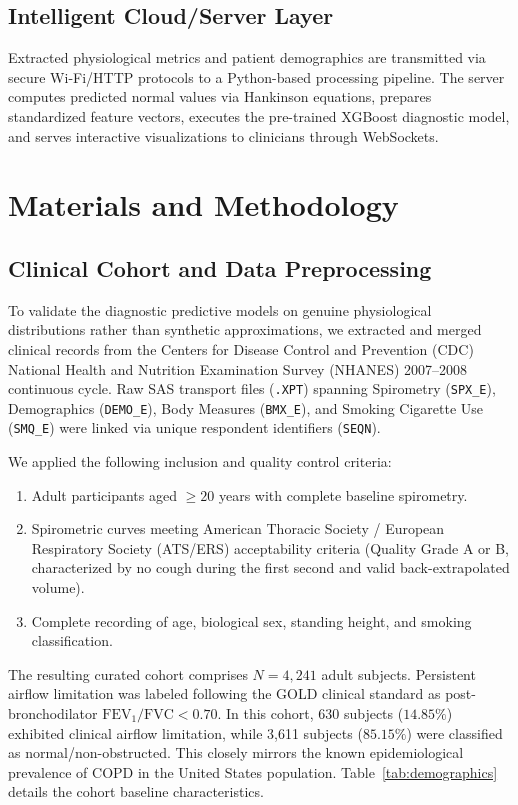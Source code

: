 \documentclass[conference]{IEEEtran}
\begin{document}
\subsection{Intelligent Cloud/Server Layer}
Extracted physiological metrics and patient demographics are transmitted via secure Wi-Fi/HTTP protocols to a Python-based processing pipeline. The server computes predicted normal values via Hankinson equations, prepares standardized feature vectors, executes the pre-trained XGBoost diagnostic model, and serves interactive visualizations to clinicians through WebSockets.

\section{Materials and Methodology}

\subsection{Clinical Cohort and Data Preprocessing}
To validate the diagnostic predictive models on genuine physiological distributions rather than synthetic approximations, we extracted and merged clinical records from the Centers for Disease Control and Prevention (CDC) National Health and Nutrition Examination Survey (NHANES) 2007--2008 continuous cycle. Raw SAS transport files (\texttt{.XPT}) spanning Spirometry (\texttt{SPX\_E}), Demographics (\texttt{DEMO\_E}), Body Measures (\texttt{BMX\_E}), and Smoking Cigarette Use (\texttt{SMQ\_E}) were linked via unique respondent identifiers (\texttt{SEQN}).

We applied the following inclusion and quality control criteria:
\begin{enumerate}
    \item Adult participants aged $\ge 20$ years with complete baseline spirometry.
    \item Spirometric curves meeting American Thoracic Society / European Respiratory Society (ATS/ERS) acceptability criteria (Quality Grade A or B, characterized by no cough during the first second and valid back-extrapolated volume).
    \item Complete recording of age, biological sex, standing height, and smoking classification.
\end{enumerate}

The resulting curated cohort comprises $N = 4,241$ adult subjects. Persistent airflow limitation was labeled following the GOLD clinical standard as post-bronchodilator $\text{FEV}_1/\text{FVC} < 0.70$. In this cohort, 630 subjects ($14.85\%$) exhibited clinical airflow limitation, while 3,611 subjects ($85.15\%$) were classified as normal/non-obstructed. This closely mirrors the known epidemiological prevalence of COPD in the United States population. Table~\ref{tab:demographics} details the cohort baseline characteristics.
\end{document}
